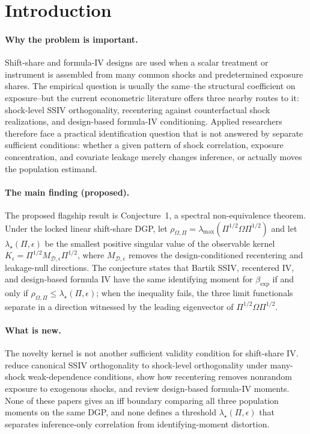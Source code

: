 \documentclass[11pt]{article}
\theoremstyle{definition}
\theoremstyle{plain}
\theoremstyle{remark}
\begin{document}
\section{Introduction}
\paragraph{Why the problem is important.}
Shift-share and formula-IV designs are used when a scalar treatment or instrument is assembled from many common shocks and predetermined exposure shares.  The empirical question is usually the same--the structural coefficient on exposure--but the current econometric literature offers three nearby routes to it: shock-level SSIV orthogonality, recentering against counterfactual shock realizations, and design-based formula-IV conditioning.  Applied researchers therefore face a practical identification question that is not answered by separate sufficient conditions: whether a given pattern of shock correlation, exposure concentration, and covariate leakage merely changes inference, or actually moves the population estimand.

\paragraph{The main finding (proposed).}
The proposed flagship result is Conjecture~1, a spectral non-equivalence theorem.  Under the locked linear shift-share DGP, let $\rho_{\Omega,\Pi}=\lambda_{\max}(\Pi^{1/2}\Omega\Pi^{1/2})$ and let $\lambda_\star(\Pi,\epsilon)$ be the smallest positive singular value of the observable kernel $K_\epsilon=\Pi^{1/2}M_{\mathcal{D},\epsilon}\Pi^{1/2}$, where $M_{\mathcal{D},\epsilon}$ removes the design-conditioned recentering and leakage-null directions.  The conjecture states that Bartik SSIV, recentered IV, and design-based formula IV have the same identifying moment for $\beta_{\exp}$ if and only if $\rho_{\Omega,\Pi}\leq \lambda_\star(\Pi,\epsilon)$; when the inequality fails, the three limit functionals separate in a direction witnessed by the leading eigenvector of $\Pi^{1/2}\Omega\Pi^{1/2}$.

\paragraph{What is new.}
The novelty kernel is not another sufficient validity condition for shift-share IV.  \citet{BorusyakHullJaravel2022REStud} reduce canonical SSIV orthogonality to shock-level orthogonality under many-shock weak-dependence conditions, \citet{BorusyakHull2023Econometrica} show how recentering removes nonrandom exposure to exogenous shocks, and \citet{BorusyakHullJaravel2025ECTJ} review design-based formula-IV moments.  None of these papers gives an iff boundary comparing all three population moments on the same DGP, and none defines a threshold $\lambda_\star(\Pi,\epsilon)$ that separates inference-only correlation from identifying-moment distortion.
\end{document}
